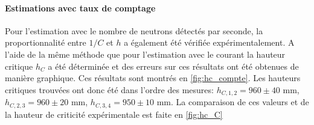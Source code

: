 \paragraph*{Estimations avec taux de comptage}
Pour l'estimation avec le nombre de neutrons détectés par seconde, la proportionnalité entre $1/C$ et $h$ a également été vérifiée expérimentalement. A l'aide de la même méthode que pour l'estimation avec le courant la hauteur critique $h_C$ a été déterminée et des erreurs sur ces résultats ont été obtenues de manière graphique. Ces résultats sont montrés en \autoref{fig:hc_compte}. Les hauteurs critiques trouvées ont donc été dans l'ordre des mesures: $h_{C,1,2} = 960 \pm 40$ \si{\milli \meter}, $h_{C,2,3} = 960 \pm 20$ \si{\milli \meter}, $h_{C,3,4} = 950 \pm 10$ \si{\milli \meter}. La comparaison de ces valeurs et de la hauteur de criticité expérimentale est faite en \autoref{fig:hc_C}
